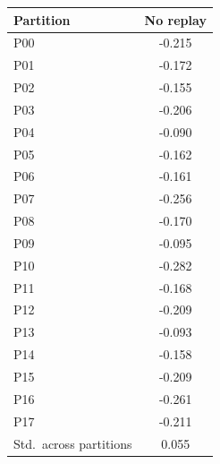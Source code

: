 \begin{tabular}{lc}
\toprule
\textbf{Partition} & \textbf{No replay} \\
\midrule
P00 & -0.215 \\
P01 & -0.172 \\
P02 & -0.155 \\
P03 & -0.206 \\
P04 & -0.090 \\
P05 & -0.162 \\
P06 & -0.161 \\
P07 & -0.256 \\
P08 & -0.170 \\
P09 & -0.095 \\
P10 & -0.282 \\
P11 & -0.168 \\
P12 & -0.209 \\
P13 & -0.093 \\
P14 & -0.158 \\
P15 & -0.209 \\
P16 & -0.261 \\
P17 & -0.211 \\
\midrule
Std.\ across partitions & 0.055 \\
\bottomrule
\end{tabular}